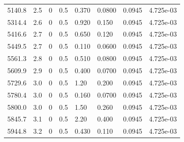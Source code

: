 \documentclass[preview]{standalone}
\begin{document}
{{{{\begin{tabular}{L{1.2cm}C{1.2cm} C{0.3cm}C{0.5cm} C{1.4cm}C{1.4cm} C{1.4cm}C{1.4cm}}
  5140.8  &   2.5  & 0     & 0.5 &  0.370  & 0.0800  & 0.0945 &  4.725e-03   \\ 
  5314.4  &   2.6  & 0     & 0.5 &  0.920  & 0.150  & 0.0945 &  4.725e-03   \\ 
  5416.6  &   2.7  & 0     & 0.5 &  0.650  & 0.120  & 0.0945 &  4.725e-03   \\ 
  5449.5  &   2.7  & 0     & 0.5 &  0.110  & 0.0600  & 0.0945 &  4.725e-03   \\ 
  5561.3  &   2.8  & 0     & 0.5 &  0.510  & 0.0800  & 0.0945 &  4.725e-03   \\ 
  5609.9  &   2.9  & 0     & 0.5 &  0.400  & 0.0700  & 0.0945 &  4.725e-03   \\ 
  5729.6  &   3.0  & 0     & 0.5 &  1.20  & 0.200  & 0.0945 &  4.725e-03   \\ 
  5780.4  &   3.0  & 0     & 0.5 &  0.160  & 0.0700  & 0.0945 &  4.725e-03   \\ 
  5800.0  &   3.0  & 0     & 0.5 &  1.50  & 0.260  & 0.0945 &  4.725e-03   \\ 
  5845.7  &   3.1  & 0     & 0.5 &  2.20  & 0.400  & 0.0945 &  4.725e-03   \\ 
  5944.8  &   3.2  & 0     & 0.5 &  0.430  & 0.110  & 0.0945 &  4.725e-03   \\ 
\hline 
\end{tabular} 

}}}}
\end{document}
